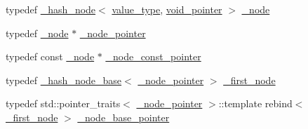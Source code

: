 \begin{DoxyCompactItemize}
\item 
typedef \hyperlink{struct__hash__node}{\+\_\+hash\+\_\+node}$<$ \hyperlink{classhash__table_a536a4f7db0e47e35283f8e04ea72e88c}{value\+\_\+type}, \hyperlink{classhash__table_a46df0d3f55f71d07f275abebec698098}{void\+\_\+pointer} $>$ \hyperlink{classhash__table_a0fec4f0d7cfac374e75932db352b7697}{\+\_\+node}
\item 
typedef \hyperlink{classhash__table_a0fec4f0d7cfac374e75932db352b7697}{\+\_\+node} $\ast$ \hyperlink{classhash__table_a7e82c643192604e0bcb21b1d7208df28}{\+\_\+node\+\_\+pointer}
\item 
typedef const \hyperlink{classhash__table_a0fec4f0d7cfac374e75932db352b7697}{\+\_\+node} $\ast$ \hyperlink{classhash__table_a94de4cb648de7c459348be7df2c9ebd3}{\+\_\+node\+\_\+const\+\_\+pointer}
\item 
typedef \hyperlink{struct__hash__node__base}{\+\_\+hash\+\_\+node\+\_\+base}$<$ \hyperlink{classhash__table_a7e82c643192604e0bcb21b1d7208df28}{\+\_\+node\+\_\+pointer} $>$ \hyperlink{classhash__table_ae649e68085e4cd585c9dd7e72360a9f4}{\+\_\+first\+\_\+node}
\item 
typedef std\+::pointer\+\_\+traits$<$ \hyperlink{classhash__table_a7e82c643192604e0bcb21b1d7208df28}{\+\_\+node\+\_\+pointer} $>$\+::template rebind$<$ \hyperlink{classhash__table_ae649e68085e4cd585c9dd7e72360a9f4}{\+\_\+first\+\_\+node} $>$ \hyperlink{classhash__table_a424f6f949f9f5edb496d1d2571633ea1}{\+\_\+node\+\_\+base\+\_\+pointer}
\end{DoxyCompactItemize}
